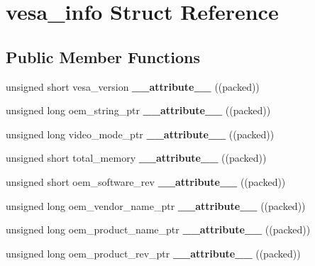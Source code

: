 \hypertarget{structvesa__info}{}\section{vesa\+\_\+info Struct Reference}
\label{structvesa__info}
\subsection*{Public Member Functions}
\begin{DoxyCompactItemize}
\item 
\mbox{\label{structvesa__info_a8d84570b33a160c91a6dafc139f9bce0}} 
unsigned short vesa\+\_\+version {\bfseries \+\_\+\+\_\+attribute\+\_\+\+\_\+} ((packed))
\item 
\mbox{\label{structvesa__info_a69b60b4b2913c9d629bd469b104a2e6e}} 
unsigned long oem\+\_\+string\+\_\+ptr {\bfseries \+\_\+\+\_\+attribute\+\_\+\+\_\+} ((packed))
\item 
\mbox{\label{structvesa__info_aa2eea3abcd8029db3900755e6179830b}} 
unsigned long video\+\_\+mode\+\_\+ptr {\bfseries \+\_\+\+\_\+attribute\+\_\+\+\_\+} ((packed))
\item 
\mbox{\label{structvesa__info_a523ee411e5f3f914e250e81383dea69d}} 
unsigned short total\+\_\+memory {\bfseries \+\_\+\+\_\+attribute\+\_\+\+\_\+} ((packed))
\item 
\mbox{\label{structvesa__info_ab4058acb678af795bbc28f3656b70b24}} 
unsigned short oem\+\_\+software\+\_\+rev {\bfseries \+\_\+\+\_\+attribute\+\_\+\+\_\+} ((packed))
\item 
\mbox{\label{structvesa__info_a25a8ec672dd442912e8508214559e7d6}} 
unsigned long oem\+\_\+vendor\+\_\+name\+\_\+ptr {\bfseries \+\_\+\+\_\+attribute\+\_\+\+\_\+} ((packed))
\item 
\mbox{\label{structvesa__info_aebabc669da0c8cc284a5bfb564708b99}} 
unsigned long oem\+\_\+product\+\_\+name\+\_\+ptr {\bfseries \+\_\+\+\_\+attribute\+\_\+\+\_\+} ((packed))
\item 
\mbox{\label{structvesa__info_ac036818f812508d3031fc74697cfc5ea}} 
unsigned long oem\+\_\+product\+\_\+rev\+\_\+ptr {\bfseries \+\_\+\+\_\+attribute\+\_\+\+\_\+} ((packed))
\end{DoxyCompactItemize}
